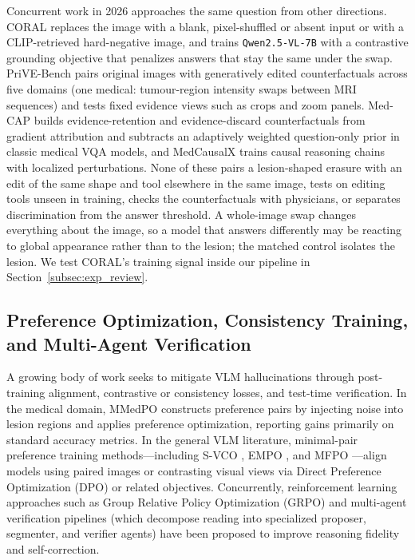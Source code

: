 \documentclass{article} %
\begin{document}
Concurrent work in 2026 approaches the same question from other directions. CORAL \citep{zafar2026coral} replaces the image with a blank, pixel-shuffled or absent input or with a CLIP-retrieved hard-negative image, and trains \texttt{Qwen2.5-VL-7B} with a contrastive grounding objective that penalizes answers that stay the same under the swap. PriVE-Bench \citep{sun2026prive} pairs original images with generatively edited counterfactuals across five domains (one medical: tumour-region intensity swaps between MRI sequences) and tests fixed evidence views such as crops and zoom panels. Med-CAP \citep{huang2026medcap} builds evidence-retention and evidence-discard counterfactuals from gradient attribution and subtracts an adaptively weighted question-only prior in classic medical VQA models, and MedCausalX \citep{lin2026medcausalx} trains causal reasoning chains with localized perturbations. None of these pairs a lesion-shaped erasure with an edit of the same shape and tool elsewhere in the same image, tests on editing tools unseen in training, checks the counterfactuals with physicians, or separates discrimination from the answer threshold. A whole-image swap changes everything about the image, so a model that answers differently may be reacting to global appearance rather than to the lesion; the matched control isolates the lesion. We test CORAL's training signal inside our pipeline in Section~\ref{subsec:exp_review}.

\subsection{Preference Optimization, Consistency Training, and Multi-Agent Verification}
\label{subsec:rw_alignment}
A growing body of work seeks to mitigate VLM hallucinations through post-training alignment, contrastive or consistency losses, and test-time verification. In the medical domain, MMedPO \citep{zhu2024mmedpo} constructs preference pairs by injecting noise into lesion regions and applies preference optimization, reporting gains primarily on standard accuracy metrics. In the general VLM literature, minimal-pair preference training methods---including S-VCO \citep{svco2024}, EMPO \citep{wu2025empo}, and MFPO \citep{jiang2025mfpo}---align models using paired images or contrasting visual views via Direct Preference Optimization (DPO) \citep{rafailov2023dpo} or related objectives. Concurrently, reinforcement learning approaches such as Group Relative Policy Optimization (GRPO) \citep{shao2024deepseekmath} and multi-agent verification pipelines (which decompose reading into specialized proposer, segmenter, and verifier agents) have been proposed to improve reasoning fidelity and self-correction.
\end{document}
